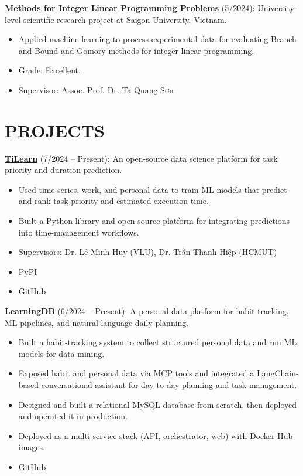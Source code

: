 \documentclass[margin]{res}
\begin{document}
\begin{resume}
\par
\href{https://sgu.edu.vn}{\textbf{Methods for Integer Linear Programming Problems}} (5/2024): University-level scientific research project at Saigon University, Vietnam.
\begin{itemize}
  \item Applied machine learning to process experimental data for evaluating Branch and Bound and Gomory methods for integer linear programming.
  \item Grade: Excellent.
  \item Supervisor: Assoc. Prof. Dr. Tạ Quang Sơn
\end{itemize}

  \section{PROJECTS}
  
  \par
  \href{https://bancie.github.io/TiLearn/}{\textbf{TiLearn}} (7/2024 -- Present): An open-source data science platform for task priority and duration prediction.
  \begin{itemize}
    \item Used time-series, work, and personal data to train ML models that predict and rank task priority and estimated execution time.
    \item Built a Python library and open-source platform for integrating predictions into time-management workflows.
    \item Supervisors: Dr. Lê Minh Huy (VLU), Dr. Trần Thanh Hiệp (HCMUT)
    \item \href{https://pypi.org/project/TiLearn/}{PyPI}
    \item \href{https://github.com/Bancie/TiLearn}{GitHub}
  \end{itemize}

  
  \par
  \href{https://github.com/Bancie/LearningDB}{\textbf{LearningDB}} (6/2024 -- Present): A personal data platform for habit tracking, ML pipelines, and natural-language daily planning.
  \begin{itemize}
    \item Built a habit-tracking system to collect structured personal data and run ML models for data mining.
    \item Exposed habit and personal data via MCP tools and integrated a LangChain-based conversational assistant for day-to-day planning and task management.
    \item Designed and built a relational MySQL database from scratch, then deployed and operated it in production.
    \item Deployed as a multi-service stack (API, orchestrator, web) with Docker Hub images.
    \item \href{https://github.com/Bancie/LearningDB}{GitHub}
  \end{itemize}


\end{resume}
\end{document}
